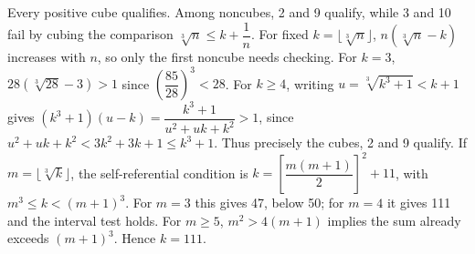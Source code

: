 Every positive cube qualifies. Among noncubes, 2 and 9 qualify, while 3 and 10 fail by cubing the comparison $\sqrt[3]{n} \le k + \dfrac{1}{n}$. For fixed $k=\lfloor\sqrt[3]n\rfloor$, $n(\sqrt[3]n-k)$ increases with $n$, so only the first noncube needs checking. For $k=3$, $28(\sqrt[3]{28}-3)>1$ since $(\dfrac{85}{28})^3 < 28$. For $k\ge4$, writing $u=\sqrt[3]{k^3+1}<k+1$ gives $(k^3+1) (u-k) = \dfrac{k^3+1}{u^2+uk+k^2} > 1$, since $u^2+uk+k^2<3k^2+3k+1\le k^3+1$. Thus precisely the cubes, 2 and 9 qualify. If $m=\lfloor\sqrt[3]k\rfloor$, the self-referential condition is $k = [\dfrac{m (m+1)}{2}]^2 + 11$, with $m^3\le k<(m+1)^3$. For $m=3$ this gives 47, below 50; for $m=4$ it gives 111 and the interval test holds. For $m\ge5$, $m^2>4(m+1)$ implies the sum already exceeds $(m+1)^3$. Hence $\boxed{k=111}$.
